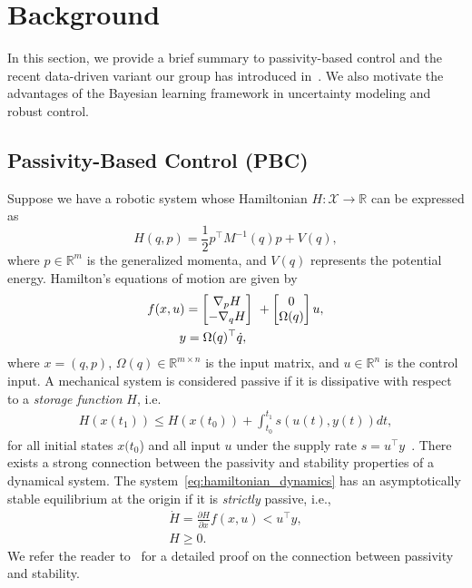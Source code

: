 \section{Background}

In this section, we provide a brief summary to passivity-based control and the
recent data-driven variant our group has introduced in~\cite{ashenafi2022robust,
sirichotiyakul2022data, acc}.
%
We also motivate the advantages of the Bayesian learning framework in
uncertainty modeling and robust control.
\subsection{Passivity-Based Control (PBC)}
\label{ssec:pbc}

Suppose we have a robotic system whose Hamiltonian $H : \mathcal{X} \rightarrow
\mathbb{R}$ can be expressed as
%
\begin{equation}
    H(q,p) = \frac{1}{2} p^\top M^{-1}(q) p + V(q),
    \label{eq:system_hamiltonian}
\end{equation}
%
where $p \in \mathbb{R}^m$ is the generalized momenta, and $V(q)$ represents the
potential energy. Hamilton's equations of motion are given by
\begin{align}
    \begin{split}  
      f(x, u) &= \bmat{\nabla_pH \\ -\nabla_qH}\ + \bmat{0 \\ \Omega(q)}u, \\
      &\hspace{-0.15cm} y = \Omega(q)^\top \dot{q},
    \end{split}
    \label{eq:hamiltonian_dynamics}
\end{align}
\noindent where $x = (q, p)$, $\Omega(q) \in \mathbb{R}^{m \times n}$ is
the input matrix, and $u \in \mathbb{R}^{n}$ is the control input.
%
%
%
A mechanical system is considered passive if it is dissipative with respect to a
\textit{storage function} $H$, i.e.
\begin{align}
  H(x(t_1)) \leq H(x(t_0)) + \int_{t_0}^{t_1} s(u(t), y(t)) dt,
\end{align}
\noindent for all initial states $x(t_0$) and all input $u$ under the
supply rate $s = u^\top y$~\cite{van2000l2}.
There exists a strong connection between the passivity and stability properties
of a dynamical system.
%
The system~\eqref{eq:hamiltonian_dynamics} has an asymptotically stable equilibrium at the
origin if it is \textit{strictly} passive, i.e.,
\begin{equation*}
  \begin{gathered}
    \dot{H} = \frac{\partial H}{\partial x} f(x,u) < u^\top y, \\
    H \geq 0.
  \end{gathered}
\end{equation*}
%
We refer the reader to~\cite{khalil2015nonlinear} for a detailed proof on the
connection between passivity and stability.

